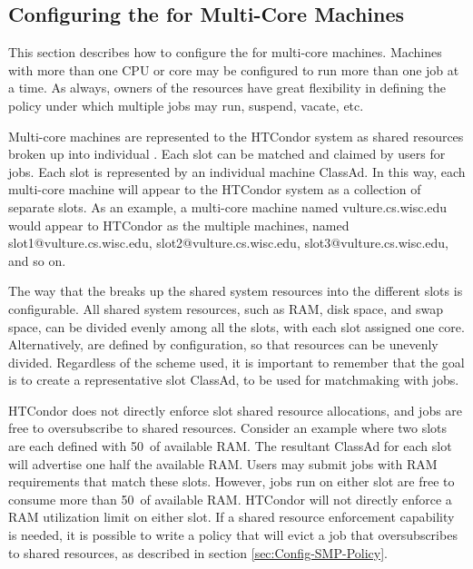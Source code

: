 \subsection{\label{sec:Configuring-SMP}
Configuring the  for Multi-Core Machines}

This section describes how to configure the  for multi-core
machines.
Machines with more than one CPU or core may
be configured to run more than one job at a time.
As always, owners of the resources have great flexibility in defining
the policy under which multiple jobs may run, suspend, vacate, etc.  

Multi-core machines are represented to the HTCondor system as
shared resources broken up into individual .
Each slot can be matched and claimed by users for jobs.
Each slot is represented by an individual machine ClassAd.
In this way, each multi-core machine will appear to the HTCondor system as
a collection of separate slots.  
As an example, a multi-core machine named
vulture.cs.wisc.edu would appear to HTCondor as the
multiple machines, named slot1@vulture.cs.wisc.edu,
slot2@vulture.cs.wisc.edu,
slot3@vulture.cs.wisc.edu, and so on.

The way that the  breaks up the
shared system resources into the different slots
is configurable.
All shared system resources, such as RAM, disk space, and swap space,
can be divided evenly among all the slots, with each
slot assigned one core.
Alternatively, 
 are defined by configuration, 
so that resources can be unevenly divided.
Regardless of the scheme used, it is important
to remember that the goal is to create a representative slot ClassAd,
to be used for matchmaking with jobs.

HTCondor does not
directly enforce slot shared resource allocations, and jobs
are free to oversubscribe to shared resources.
Consider an example where two slots are each defined with 50\Percent\ of
available RAM.  The resultant ClassAd for each slot will advertise one
half the available RAM.  Users may submit jobs with RAM requirements
that match these slots.  However, jobs run on either slot are free to
consume more than 50\Percent\ of available RAM.  HTCondor will not
directly enforce a RAM utilization limit on either slot.  If a shared
resource enforcement capability is needed, 
it is possible to write a
policy that will evict a job that oversubscribes to shared
resources, as described in section \ref{sec:Config-SMP-Policy}.

